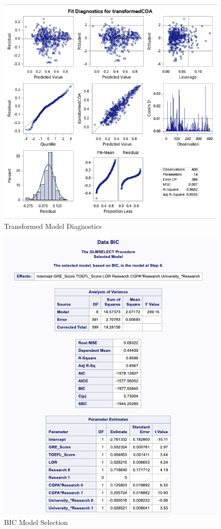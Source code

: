 \documentclass{article}
\begin{document}
\begin{figure}
\centering
\includegraphics[scale=0.7]{transformed_model_diagnostics.png}
\caption{Transformed Model Diagnostics}
\label{fig:transformedmodeldiagnostics}
\end{figure}

\begin{figure}
\centering
\includegraphics[scale=0.7]{bic.png}
\caption{BIC Model Selection}
\label{fig:bic}
\end{figure}
\end{document}
